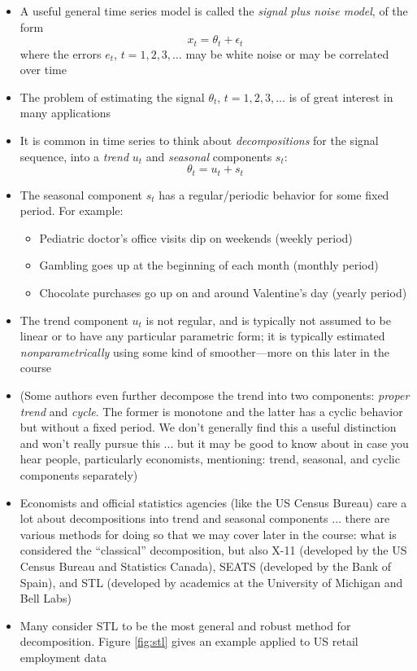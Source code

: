 \documentclass{article}
\begin{document}
\begin{itemize}
\item A useful general time series model is called the \emph{signal plus noise
    model}, of the form 
  \[
  x_t = \theta_t + \epsilon_t
  \]
  where the errors $e_t$, $t = 1,2,3,\dots$ may be white noise or may be
  correlated over time

\item The problem of estimating the signal $\theta_t$, $t = 1,2,3,\dots$ is of
  great interest in many applications 

\item It is common in time series to think about \emph{decompositions} for the
  signal sequence, into a \emph{trend} $u_t$ and \emph{seasonal} components
  $s_t$: 
  \[
  \theta_t = u_t + s_t 
  \]

\item The seasonal component $s_t$ has a regular/periodic behavior for some
  fixed period. For example: 

\begin{itemize}
\item Pediatric doctor's office visits dip on weekends (weekly period)
\item Gambling goes up at the beginning of each month (monthly period)
\item Chocolate purchases go up on and around Valentine's day (yearly period)
\end{itemize}

\item The trend component $u_t$ is not regular, and is typically not assumed to
  be linear or to have any particular parametric form; it is typically estimated  
  \emph{nonparametrically} using some kind of smoother---more on this later in 
  the course     

\item (Some authors even further decompose the trend into two components: 
  \emph{proper trend} and \emph{cycle}. The former is monotone and the latter
  has a cyclic behavior but without a fixed period. We don't generally find this
  a useful distinction and won't really pursue this ... but it may be good to
  know about in case you hear people, particularly economists, mentioning:
  trend, seasonal, and cyclic components separately)  

\item Economists and official statistics agencies (like the US Census Bureau) 
  care a lot about decompositions into trend and seasonal components ... there
  are various methods for doing so that we may cover later in the course: what
  is considered the ``classical'' decomposition, but also X-11 (developed by the
  US Census Bureau and Statistics Canada), SEATS (developed by the Bank of
  Spain), and STL (developed by academics at the University of Michigan and Bell 
  Labs)

\item Many consider STL to be the most general and robust method for
  decomposition. Figure \ref{fig:stl} gives an example applied to US retail
  employment data 
\end{itemize}
\end{document}
